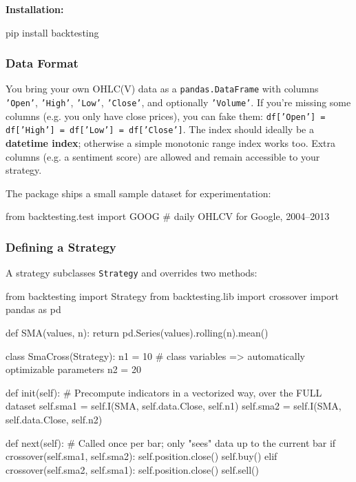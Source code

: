 \documentclass[12pt,openany]{book}
\theoremstyle{definition}
\theoremstyle{remark}
\begin{document}
\textbf{Installation:}

\begin{python}
pip install backtesting
\end{python}
\subsubsection{Data Format}

You bring your own OHLC(V) data as a \texttt{pandas.DataFrame} with columns \texttt{'Open'}, \texttt{'High'}, \texttt{'Low'}, \texttt{'Close'}, and optionally \texttt{'Volume'}. If you're missing some columns (e.g. you only have close prices), you can fake them: \texttt{df['Open'] = df['High'] = df['Low'] = df['Close']}. The index should ideally be a \textbf{datetime index}; otherwise a simple monotonic range index works too. Extra columns (e.g. a sentiment score) are allowed and remain accessible to your strategy.

The package ships a small sample dataset for experimentation:

\begin{python}
from backtesting.test import GOOG   # daily OHLCV for Google, 2004--2013
\end{python}
\subsubsection{Defining a Strategy}

A strategy subclasses \texttt{Strategy} and overrides two methods:

\begin{python}
from backtesting import Strategy
from backtesting.lib import crossover
import pandas as pd

def SMA(values, n):
    return pd.Series(values).rolling(n).mean()

class SmaCross(Strategy):
    n1 = 10   # class variables => automatically optimizable parameters
    n2 = 20

    def init(self):
        # Precompute indicators in a vectorized way, over the FULL dataset
        self.sma1 = self.I(SMA, self.data.Close, self.n1)
        self.sma2 = self.I(SMA, self.data.Close, self.n2)

    def next(self):
        # Called once per bar; only "sees" data up to the current bar
        if crossover(self.sma1, self.sma2):
            self.position.close()
            self.buy()
        elif crossover(self.sma2, self.sma1):
            self.position.close()
            self.sell()
\end{python}
\end{document}
